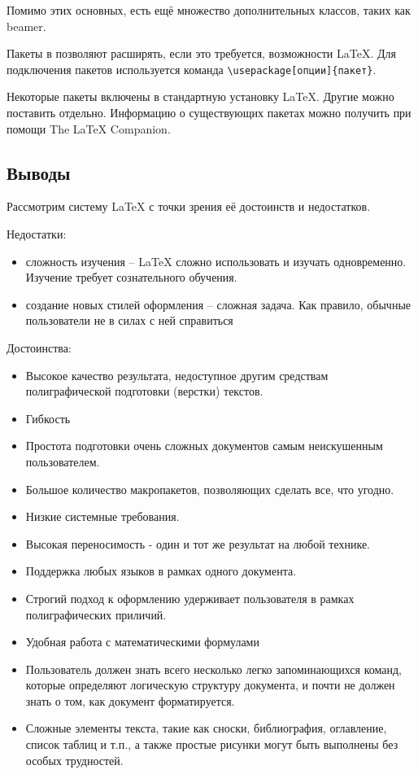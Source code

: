 \documentclass[12pt,a4paper]{article}
\begin{document}
Помимо этих основных, есть ещё множество дополнительных классов, таких как beamer.

Пакеты в позволяют расширять, если это требуется, возможности LaTeX. Для подключения пакетов используется команда \verb+\usepackage[опции]{пакет}+.

Некоторые пакеты включены в стандартную установку LaTeX. Другие можно поставить отдельно. Информацию о существующих пакетах можно получить при помощи The LaTeX Companion.
\subsection{Выводы}

Рассмотрим систему LaTeX с точки зрения её достоинств и недостатков.

Недостатки:
\begin{itemize}
\item сложность изучения -- LaTeX сложно использовать и изучать одновременно. Изучение требует сознательного обучения.
\item создание новых стилей оформления -- сложная задача. Как правило, обычные пользователи не в силах с ней справиться
\end{itemize}

Достоинства:
\begin{itemize}
\item Высокое качество результата, недоступное другим средствам полиграфической подготовки (верстки) текстов.
\item Гибкость
\item Простота подготовки очень сложных документов самым неискушенным пользователем.
\item Большое количество макропакетов, позволяющих сделать все, что угодно.
\item Низкие системные требования.
\item Высокая переносимость - один и тот же результат на любой технике.
\item Поддержка любых языков в рамках одного документа.
\item Строгий подход к оформлению удерживает пользователя в рамках полиграфических приличий.
\item Удобная работа с математическими формулами
\item Пользователь должен знать всего несколько легко запоминающихся команд, которые определяют логическую структуру документа, и почти не должен знать о том, как документ форматируется.
\item Сложные элементы текста, такие как сноски, библиография, оглавление, список таблиц и т.п., а также простые рисунки могут быть выполнены без особых трудностей.
\end{itemize}
\end{document}
